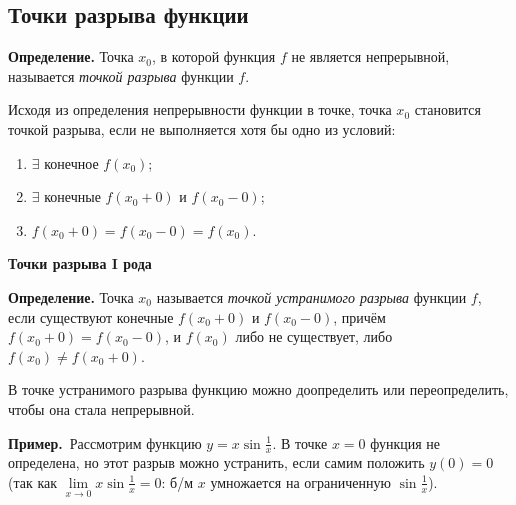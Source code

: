 \documentclass[a4paper,11pt]{article}
\newcommand{\lead}[1]{\textbf{\color{leadcol}#1}\ }
\newcommand{\prim}{\textbf{Пример.}\ }
\begin{document}
\subsection{Точки разрыва функции}

\begin{opr}
\textbf{Определение.} Точка $x_0$, в которой функция $f$ не является непрерывной, называется
\emph{точкой разрыва} функции $f$.
\end{opr}

Исходя из определения непрерывности функции в точке, точка $x_0$ становится точкой разрыва,
если не выполняется хотя бы одно из условий:
\begin{enumerate}[label=\arabic*)]
  \item $\exists$ конечное $f(x_0)$;
  \item $\exists$ конечные $f(x_0 + 0)$ и $f(x_0 - 0)$;
  \item $f(x_0 + 0) = f(x_0 - 0) = f(x_0)$.
\end{enumerate}

\lead{Точки разрыва I рода}

\begin{opr}
\textbf{Определение.} Точка $x_0$ называется \emph{точкой устранимого разрыва} функции $f$, если
существуют конечные $f(x_0 + 0)$ и $f(x_0 - 0)$, причём $f(x_0 + 0) = f(x_0 - 0)$, и $f(x_0)$
либо не существует, либо $f(x_0) \ne f(x_0 + 0)$.
\end{opr}

\begin{center}
\end{center}

В точке устранимого разрыва функцию можно доопределить или переопределить, чтобы она стала непрерывной.

\prim Рассмотрим функцию $y = x \sin\frac{1}{x}$. В точке $x = 0$ функция не определена,
но этот разрыв можно устранить, если самим положить $y(0) = 0$
(так как $\lim\limits_{x \to 0} x \sin\frac{1}{x} = 0$: б/м $x$ умножается на ограниченную $\sin\frac1x$).
\end{document}

